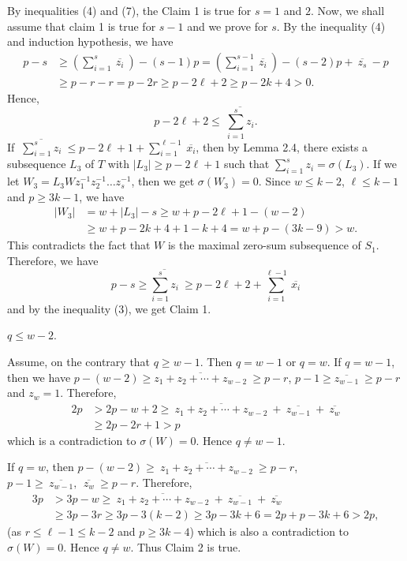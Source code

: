 \documentclass[fleqn]{mat01}
\begin{document}
\begin{pot}
{By inequalities (4) and (7), the Claim 1 is true for $s = 1$ and $2$.
Now, we shall assume that claim 1 is true for $s-1$ and we prove for
$s$. By the inequality (4) and induction hypothesis, we have
\begin{align*}
p-s &\geq \left(\sum_{i=1}^s \ \overline{z_i} \ \right) - (s-1)p =
\left(\sum_{i=1}^{s-1} \ \overline{z_i} \ \right) - (s-2)p + \
\overline{z_s} \ -p\\[.3pc]
&\geq p-r-r= p-2r\geq p-2\ell+2 \geq p-2k+4 > 0.
\end{align*}
Hence,
\begin{equation*}
p-2\ell+2\leq  \ \overline{\sum_{i=1}^sz_i}.
\end{equation*}
If $ \ \overline{\sum_{i=1}^sz_i} \ \leq p-2\ell+1+\sum_{i=1}^{\ell-1} \
\overline{x_i}$, then by Lemma 2.4, there exists a subsequence $L_3$ of
$T$ with $|L_3|\geq p-2\ell+1$ such that $\sum_{i=1}^sz_i =
\sigma(L_3)$. If we let $W_3 = L_3Wz_1^{-1}z_2^{-1}\ldots z_s^{-1}$,
then we get $\sigma(W_3) = 0$. Since $w\leq k-2$, $\ell\leq k-1$ and
$p\geq 3k-1$, we have
\begin{align*}
|W_3| &= w+|L_3|-s\geq w + p-2\ell+1 -(w-2)\\[.3pc]
&\geq w + p - 2k + 4 + 1 - k + 4 = w + p - (3k - 9) > w.
\end{align*}
This contradicts the fact that $W$ is the maximal zero-sum subsequence
of $S_1$. Therefore, we have
\begin{equation*}
p-s\geq \overline{\sum_{i=1}^sz_i} \ \geq p-2\ell+2+\sum_{i=1}^{\ell-1}
\ \overline{x_i}
\end{equation*}
and by the inequality (3), we get Claim 1.

\begin{cla}{\rm $q \leq w -2$.}
\end{cla}

\noindent Assume, on the contrary that $q\geq w-1$. Then $q = w-1$ or $q
= w$. If $q = w-1$, then we have $p -(w-2)\geq
\overline{z_1+z_2+\cdots+z_{w-2}} \ \geq p-r$, $p-1\geq
\overline{z_{w-1}} \ \geq p-r$ and $z_w = 1$. Therefore,
\begin{align*}
2p &> 2p -w +2 \geq \ \overline{z_1+z_2+\cdots+z_{w-2}} \ + \
\overline{z_{w-1}} \ + \ \overline{z_w}\\[.3pc]
&\geq 2p-2r+1 > p
\end{align*}
which is a contradiction to $\sigma(W)=0$. Hence $q\ne w-1$.

If $q = w$, then $p -(w-2)\geq \ \overline{z_1+z_2+\cdots+z_{w-2}} \
\geq p-r$, \ \ $p-1\geq \ \overline{z_{w-1}}, \ \ \overline{z_w} \ \geq
p-r$. Therefore,
\begin{align*}
3p &> 3p -w \geq \ \overline{z_1+z_2+\cdots+z_{w-2}} \ + \
\overline{z_{w-1}} \ + \ \overline{z_w}\\[.3pc]
&\geq 3p -3r \geq 3p -3(k-2)\geq 3p -3k+6 = 2p +p-3k+6> 2p,
\end{align*}
(as $r\leq \ell-1\leq k-2$ and $p\geq 3k-4$) which is also a
contradiction to $\sigma(W) =0$. Hence $q\ne w$. Thus Claim 2 is
true.

}
\end{pot}
\end{document}

